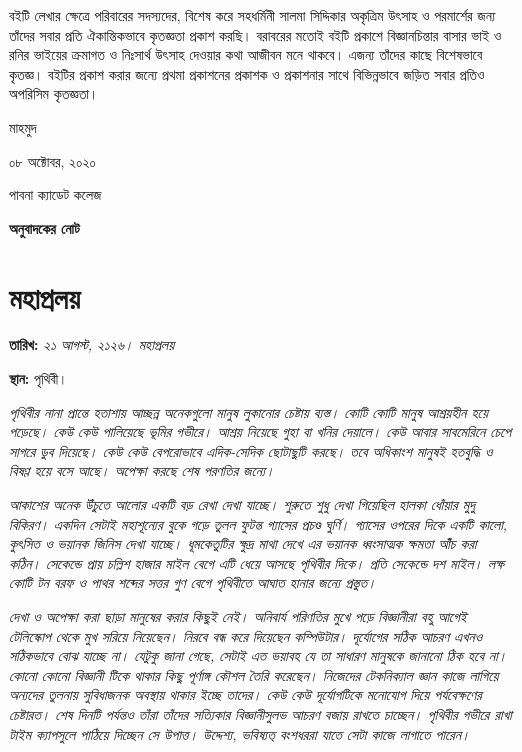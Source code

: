 \documentclass[
]{book}
\begin{document}
বইটি লেখার ক্ষেত্রে পরিবারের সদস্যদের, বিশেষ করে সহধর্মিনী সালমা সিদ্দিকার অকৃত্রিম উৎসাহ ও পরমার্শের জন্য তাঁদের সবার প্রতি ঐকান্তিকভাবে কৃতজ্ঞতা প্রকাশ করছি। বরাবরের মতোই বইটি প্রকাশে বিজ্ঞানচিন্তার বাসার ভাই ও রনির ভাইয়ের ক্রমাগত ও নিঃসার্থ উৎসাহ দেওয়ার কথা আজীবন মনে থাকবে। এজন্য তাঁদের কাছে বিশেষভাবে কৃতজ্ঞ। বইটির প্রকাশ করার জন্যে প্রথমা প্রকাশনের প্রকাশক ও প্রকাশনার সাথে বিভিন্নভাবে জড়িত সবার প্রতিও অপরিসিম কৃতজ্ঞতা।

মাহমুদ

০৮ অক্টোবর, ২০২০

পাবনা ক্যাডেট কলেজ

\textbf{অনুবাদকের নোট}

\hypertarget{doomsday}{%
\section{মহাপ্রলয়}\label{doomsday}}

\textbf{তারিখ:} \emph{২১ আগস্ট, ২১২৬। মহাপ্রলয়}

\textbf{স্থান:} পৃথিবী।

\emph{পৃথিবীর নানা প্রান্তে হতাশায় আচ্ছন্ন অনেকগুলো মানুষ লুকানোর চেষ্টায় ব্যস্ত। কোটি কোটি মানুষ আশ্রয়হীন হয়ে পড়েছে। কেউ কেউ পালিয়েছে ভূমির গভীরে। আশ্রয় নিয়েছে গুহা বা খনির দেয়ালে। কেউ আবার সাবমেরিনে চেপে সাগরে ডুব দিয়েছে। কেউ কেউ বেপরোভাবে এদিক-সেদিক ছোটাছুটি করছে। তবে অধিকাংশ মানুষই হতবুদ্ধি ও বিষণ্ণ হয়ে বসে আছে। অপেক্ষা করছে শেষ পরণতির জন্যে। }

\emph{আকাশের অনেক উঁচুতে আলোর একটি বড় রেখা দেখা যাচ্ছে। শুরুতে শুধু দেখা গিয়েছিল হালকা ধোঁয়ার মুদু বিকিরণ। একদিন সেটাই মহাশূন্যের বুকে গড়ে তুলল ফুটন্ত গ্যাসের প্রচণ্ড ঘুর্ণি। গ্যাসের ওপরের দিকে একটি কালো, কুৎসিত ও ভয়ানক জিনিস দেখা যাচ্ছে। ধূমকেতুটির ক্ষুদ্র মাথা দেখে এর ভয়ানক ধ্বংসাত্মক ক্ষমতা আঁঁচ করা কঠিন। সেকেন্ডে প্রায় চল্লিশ হাজার মাইল বেগে এটি ধেয়ে আসছে পৃথিবীর দিকে। প্রতি সেকেন্ডে দশ মাইল। লক্ষ কোটি টন বরফ ও পাথর শব্দের সত্তর গুণ বেগে পৃথিবীতে আঘাত হানার জন্যে প্রস্তুত। }

\emph{দেখা ও অপেক্ষা করা ছাড়া মানুষের করার কিছুই নেই। অনিবার্য পরিণতির মুখে পড়ে বিজ্ঞানীরা বহু আগেই টেলিস্কোপ থেকে মুখ সরিয়ে নিয়েছেন। নিরবে বন্ধ করে দিয়েছেন কম্পিউটার। দূর্যোগের সঠিক আচরণ এখনও সঠিকভাবে বোঝ যাচ্ছে না। যেটুকু জানা গেছে, সেটাই এত ভয়াবহ যে তা সাধারণ মানুষকে জানানো ঠিক হবে না। কোনো কোনো বিজ্ঞানী টিকে থাকার কিছু পূর্ণাঙ্গ কৌশল তৈরি করেছেন। নিজেদের টেকনিক্যাল জ্ঞান কাজে লাগিয়ে অন্যদের তুলনায় সুবিধাজনক অবস্থায় থাকার ইচ্ছে তাদের। কেউ কেউ দূর্যোগটিকে মনোযোগ দিয়ে পর্যবেক্ষণের চেষ্টারত। শেষ দিনটি পর্যন্তও তাঁরা তাঁদের সত্যিকার বিজ্ঞানীসুলভ আচরণ বজায় রাখতে চাচ্ছেন। পৃথিবীর গভীরে রাখা টাইম ক্যাপসুলে পাঠিয়ে দিচ্ছেন সে উপাত্ত। উদ্দেশ্য, ভবিষ্যত্ বংশধররা যাতে সেটা কাজে লাগাতে পারেন। }
\end{document}
